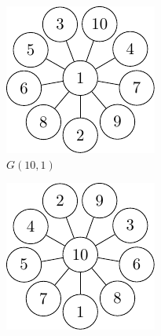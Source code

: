 \begin{figure}
    \centering
    \begin{subfigure}[b]{0.35\textwidth}
        \includegraphics[width=\textwidth]{chapters/gcol/figs/g-10-1.pdf}
        \caption{\label{fig:gcol:g-10-1}\(G(10,1)\)}
    \end{subfigure}
    \hfill
    \begin{subfigure}[b]{0.35\textwidth}
        \includegraphics[width=\textwidth]{chapters/gcol/figs/g-10-10.pdf}

\end{subfigure}
\end{figure}

